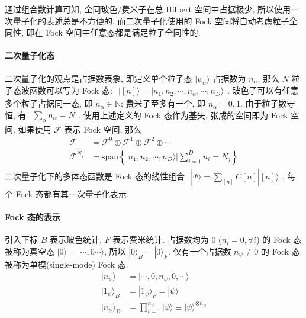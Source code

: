 \documentclass[../../main.tex]{subfiles}
\begin{document}
通过组合数计算可知, 全同玻色/费米子在总 Hilbert 空间中占据极少, 所以使用一次量子化的表述总是不方便的. 而二次量子化使用的 Fock 空间将自动考虑粒子全同性, 即在 Fock 空间中任意态都是满足粒子全同性的.

\paragraph{二次量子化态}

二次量子化的观点是占据数表象, 即定义单个粒子态 $|\psi_{\alpha}\rangle$ 占据数为 $n_{\alpha}$, 那么 $N$ 粒子态波函数可以写为 Fock 态: $\begin{aligned}
  |[n]\rangle = |n_{1},n_{2},\cdots,n_{\alpha},\cdots,n_{D}\rangle
\end{aligned}$. 玻色子可以有任意多个粒子占据同一态, 即 $n_{\alpha}\in\mathbb{N}$; 费米子至多有一个, 即 $n_{\alpha}=0,1$. 由于粒子数守恒, 有 $\begin{aligned}
  \sum_{\alpha}n_{\alpha} = N
\end{aligned}$. 使用上述定义的 Fock 态作为基矢, 张成的空间即为 Fock 空间. 如果使用 $\mathcal{F}$ 表示 Fock 空间, 那么 \begin{align*}
  \mathcal{F} &= \mathcal{F}^{0}\oplus \mathcal{F}^{1}\oplus\mathcal{F}^{2}\oplus\cdots\\
  \mathcal{F}^{N_{j}} &= \text{span}\left\{\big|n_{1},n_{2},\cdots,n_{D}\big\rangle|\sum_{i=1}^{D}n_{i} = N_{j}\right\}
\end{align*}
二次量子化下的多体态函数是 Fock 态的线性组合 $\begin{aligned}
  |\Psi\rangle = \sum_{[n]}C[n]|[n]\rangle
\end{aligned}$, 每个 Fock 态都有其一次量子化表示.

\paragraph{Fock 态的表示}
引入下标 $B$ 表示玻色统计, $F$ 表示费米统计. 占据数均为 $0$ ($n_{i}=0,\forall i$) 的 Fock 态被称为真空态 $|0\rangle = |\cdots,0\cdots\rangle$, 所以 $|0\rangle_{B}=|0\rangle_{F}$. 仅有一个占据数 $n_{\psi}\neq 0$ 的 Fock 态被称为单模(single-mode) Fock 态. 
\begin{align*}
  |n_{\psi}\rangle &= |\cdots,0,n_{\psi},0,\cdots\rangle\\
  |1_{\psi}\rangle_{B} &= |1_{\psi}\rangle_{F} = |\psi\rangle\\
  |n_{\psi}\rangle_{B} &= \prod_{i=1}^{n_{\psi}}|\psi\rangle\equiv |\psi\rangle^{\otimes n_{\psi}}
\end{align*}
\end{document}
